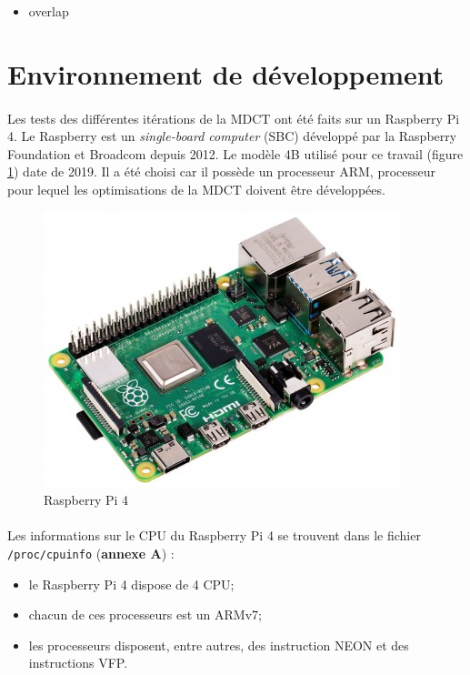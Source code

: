 \documentclass{article}
\begin{document}
    \begin{itemize}
        \item overlap
    \end{itemize}



    \newpage
    \section{Environnement de développement}

    \paragraph{}
    Les tests des différentes itérations de la MDCT ont été faits sur un Raspberry Pi 4. Le Raspberry est un \emph{single-board computer} (SBC) développé par la Raspberry Foundation et Broadcom depuis 2012. Le modèle 4B utilisé pour ce travail (figure \ref{fig:raspberry}) date de 2019. Il a été choisi car il possède un processeur ARM, processeur pour lequel les optimisations de la MDCT doivent être développées\cite{raspberry-doc}.

    \begin{figure}[H]
        \centering
        \includegraphics[width=.4\linewidth]{./images/raspberry.png}
        \caption{Raspberry Pi 4}
        \label{fig:raspberry}
    \end{figure}

    \paragraph{}
    Les informations sur le CPU du Raspberry Pi 4 se trouvent dans le fichier \texttt{/proc/cpuinfo} (\textbf{annexe A}) :
    \begin{itemize}
        \item le Raspberry Pi 4 dispose de 4 CPU;
        \item chacun de ces processeurs est un ARMv7;
        \item les processeurs disposent, entre autres, des instruction NEON et des instructions VFP.
    \end{itemize}
\end{document}
